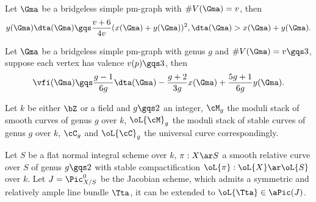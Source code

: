 \documentclass[a4paper, twoside]{article}
\begin{document}
\begin{thm}
	Let $\Gma$ be a bridgeless simple pm-graph with $\#V(\Gma)=v$, then
	\[
		y(\Gma)\dta(\Gma)\gqs\frac{v+6}{4v}(x(\Gma)+y(\Gma))^{2}, \dta(\Gma)>x(\Gma)+y(\Gma).
	\]
\end{thm}

\begin{thm}
	Let $\Gma$ be a bridgeless simple pm-graph with genus $g$ and $\#V(\Gma)=v\gqs3$, suppose each vertex has valence $v(p)\gqs3$, then
	\[
		\vfi(\Gma)\gqs\frac{g-1}{6g}\dta(\Gma)-\frac{g+2}{3g}x(\Gma)+\frac{5g+1}{6g}y(\Gma).
	\]
\end{thm}





\begin{stp}
	Let $k$ be either $\bZ$ or a field and $g\gqs2$ an integer, $\cM_{g}$ the moduli stack of smooth curves of genus $g$ over $k$, $\oL{\cM}_{g}$ the moduli stack of stable curves of genus $g$ over $k$, $\cC_{g}$ and $\oL{\cC}_{g}$ the universal curve correspondingly.

	Let $S$ be a  flat normal integral scheme over $k$, $\pi:X\ar S$ a smooth relative curve over $S$ of genus $g\gqs2$ with stable compactification $\oL{\pi}:\oL{X}\ar\oL{S}$ over $k$. Let $J=\Pic_{X/S}^{0}$ be the Jacobian scheme, which admits a symmetric and relatively ample line bundle $\Tta$, it can be extended to $\oL{\Tta}\in\aPic(J)$.
\end{stp}
\end{document}
